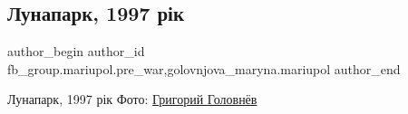  
 
 
 
 

\subsection{Лунапарк, 1997 рік}
\label{sec:16_02_2023.fb.fb_group.mariupol.pre_war.1.lunapark__1997_r_k}
 
\ifcmt
 author_begin
   author_id fb_group.mariupol.pre_war,golovnjova_maryna.mariupol
 author_end
\fi

Лунапарк, 1997 рік Фото: \href{https://www.facebook.com/profile.php?id=100007639428240}{Григорий Головнёв}

